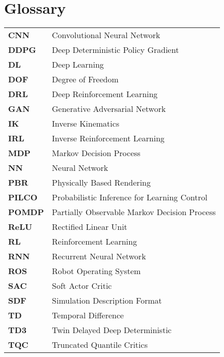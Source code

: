 %
\chapter*{Glossary}

\capstartfalse
\begin{table}[!hb]
    \begin{tabular}{ll}
        \textbf{CNN}   & Convolutional Neural Network                 \\
        \textbf{DDPG}  & Deep Deterministic Policy Gradient           \\
        \textbf{DL}    & Deep Learning                                \\
        \textbf{DOF}   & Degree of Freedom                            \\
        \textbf{DRL}   & Deep Reinforcement Learning                  \\
        \textbf{GAN}   & Generative Adversarial Network               \\
        \textbf{IK}    & Inverse Kinematics                           \\
        \textbf{IRL}   & Inverse Reinforcement Learning               \\
        \textbf{MDP}   & Markov Decision Process                      \\
        \textbf{NN}    & Neural Network                               \\
        \textbf{PBR}   & Physically Based Rendering                   \\
        \textbf{PILCO} & Probabilistic Inference for Learning Control \\
        \textbf{POMDP} & Partially Observable Markov Decision Process \\
        \textbf{ReLU}  & Rectified Linear Unit                        \\
        \textbf{RL}    & Reinforcement Learning                       \\
        \textbf{RNN}   & Recurrent Neural Network                     \\
        \textbf{ROS}   & Robot Operating System                       \\
        \textbf{SAC}   & Soft Actor Critic                            \\
        \textbf{SDF}   & Simulation Description Format                \\
        \textbf{TD}    & Temporal Difference                          \\
        \textbf{TD3}   & Twin Delayed Deep Deterministic              \\
        \textbf{TQC}   & Truncated Quantile Critics                   \\
    \end{tabular}
\end{table}
\capstarttrue
